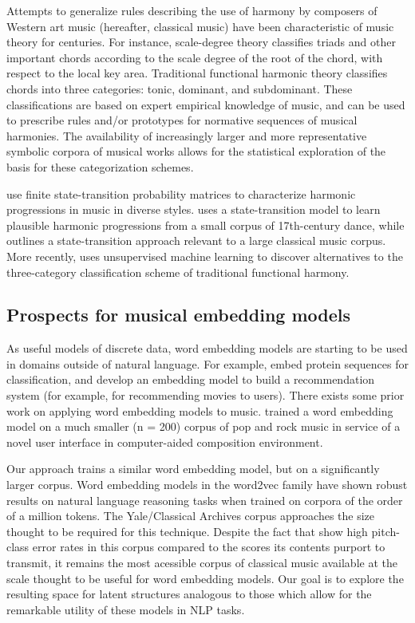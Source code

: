 Attempts to generalize rules describing the use of harmony by composers of Western art music (hereafter, classical music) have been characteristic of music theory for centuries. For instance, scale-degree theory classifies triads and other important chords according to the scale degree of the root of the chord, with respect to the local key area. Traditional functional harmonic theory classifies chords into three categories: tonic, dominant, and subdominant. These classifications are based on expert empirical knowledge of music, and can be used to prescribe rules and/or prototypes for normative sequences of musical harmonies. The availability of increasingly larger and more representative symbolic corpora of musical works allows for the statistical exploration of the basis for these categorization schemes.

\cite{nichols_data-driven_2009, temperley_statistical_2013} use finite state-transition probability matrices to characterize harmonic progressions in music in diverse styles. \cite{Ponsford99} uses a state-transition model to learn plausible harmonic progressions from a small corpus of 17th-century dance, while \cite{collins_corpus-sensitive_2015} outlines a state-transition approach relevant to a large classical music corpus. More recently, \cite{White2013} uses unsupervised machine learning to discover alternatives to the three-category classification scheme of traditional functional harmony.

\subsection{Prospects for musical embedding models}

As useful models of discrete data, word embedding models are starting to be used in domains outside of natural language. For example, \cite{Asgari2015} embed protein sequences for classification, and \cite{Guardia-Sebaoun2015} develop an embedding model to build a recommendation system (for example, for recommending movies to users). There exists some prior work on applying word embedding models to music. \cite{Huang2016} trained a word embedding model on a much smaller (n = 200) corpus of pop and rock music in service of a novel user interface in computer-aided composition environment. 

Our approach trains a similar word embedding model, but on a significantly larger corpus. Word embedding models in the word2vec family have shown robust results on natural language reasoning tasks when trained on corpora of the order of a million tokens. The Yale/Classical Archives corpus approaches the size thought to be required for this technique. Despite the fact that \cite{Shanahan2013} show high pitch-class error rates in this corpus compared to the scores its contents purport to transmit, it remains the most acessible corpus of classical music available at the scale thought to be useful for word embedding models. Our goal is to explore the resulting space for latent structures analogous to those which allow for the remarkable utility of these models in NLP tasks. 

